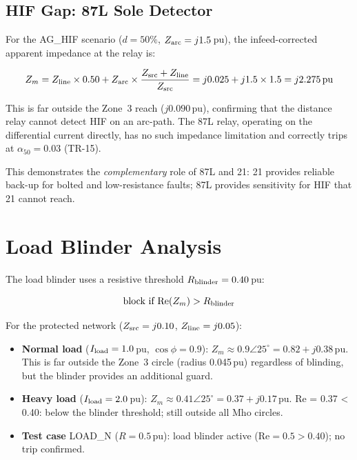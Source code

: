 \documentclass[11pt, a4paper]{article}
\begin{document}
\subsection{HIF Gap: 87L Sole Detector}

For the AG\_HIF scenario ($d=50\%$, $Z_{\rm arc} = j1.5$\,pu), the
infeed-corrected apparent impedance at the relay is:

\begin{equation}
  Z_m = Z_{\rm line} \times 0.50 + Z_{\rm arc} \times \frac{Z_{\rm src}+Z_{\rm line}}{Z_{\rm src}}
      = j0.025 + j1.5 \times 1.5 = j2.275\,\text{pu}
\end{equation}

This is far outside the Zone~3 reach ($j0.090$\,pu), confirming that the
distance relay cannot detect HIF on an arc-path.  The 87L relay, operating
on the differential current directly, has no such impedance limitation and
correctly trips at $\alpha_{50} = 0.03$ (TR-15).

This demonstrates the \emph{complementary} role of 87L and 21: 21 provides
reliable back-up for bolted and low-resistance faults; 87L provides
sensitivity for HIF that 21 cannot reach.


\section{Load Blinder Analysis}
\label{sec:blinder}

The load blinder uses a resistive threshold $R_{\rm blinder} = 0.40$\,pu:

\begin{equation}
  \text{block if } \mathrm{Re}(Z_m) > R_{\rm blinder}
\end{equation}

For the protected network ($Z_{\rm src}=j0.10$, $Z_{\rm line}=j0.05$):
\begin{itemize}
  \item \textbf{Normal load} ($I_{\rm load}=1.0$\,pu, $\cos\phi=0.9$):
        $Z_m \approx 0.9\angle 25^\circ = 0.82{+}j0.38$\,pu.
        This is far outside the Zone~3 circle (radius 0.045\,pu) regardless
        of blinding, but the blinder provides an additional guard.
  \item \textbf{Heavy load} ($I_{\rm load}=2.0$\,pu):
        $Z_m \approx 0.41\angle 25^\circ = 0.37{+}j0.17$\,pu.
        Re = 0.37 < 0.40: below the blinder threshold; still outside all
        Mho circles.
  \item \textbf{Test case} LOAD\_N ($R=0.5$\,pu): load blinder active
        ($\mathrm{Re}=0.5 > 0.40$); no trip confirmed.
\end{itemize}
\end{document}
